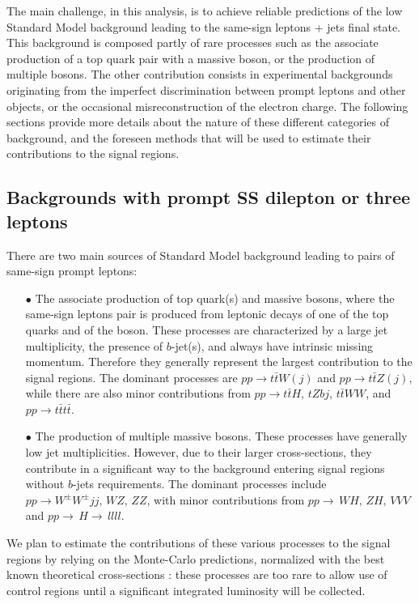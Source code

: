 The main challenge, in this analysis, is to achieve reliable predictions of the low Standard Model background 
leading to the same-sign leptons + jets final state. 
This background is composed partly of rare processes such as the associate production of a top quark pair with a massive boson, 
or the production of multiple bosons. 
The other contribution consists in experimental backgrounds originating from the imperfect discrimination between prompt leptons and other objects, 
or the occasional misreconstruction of the electron charge. 
The following sections provide more details about the nature of these different categories of background, 
and the foreseen methods that will be used to estimate their contributions to the signal regions. 

\subsection{Backgrounds with prompt SS dilepton or three leptons}
\label{sec:bkg_prompt}

There are two main sources of Standard Model background leading to pairs of same-sign prompt leptons: 
\begin{itemize}
\item[$\bullet$] The associate production of top quark(s) and massive bosons, where the same-sign leptons pair 
is produced from leptonic decays of one of the top quarks and of the boson. 
These processes are characterized by a large jet multiplicity, the presence of $b$-jet(s), 
and always have intrinsic missing momentum. 
Therefore they generally represent the largest contribution to the signal regions. 
The dominant processes are $pp\to t\bar{t}W(j)$ and $pp\to t\bar{t}Z(j)$, 
while there are also minor contributions from $pp\to t\bar{t}H,\,tZbj,\,t\bar{t}WW$, and $pp\to t\bar{t}t\bar{t}$. 
\item[$\bullet$] The production of multiple massive bosons. 
These processes have generally low jet multiplicities. 
However, due to their larger cross-sections, they contribute in a significant way to the background entering signal regions without $b$-jets requirements. 
The dominant processes include $pp\to W^\pm W^\pm jj,\,WZ,\,ZZ$, 
with minor contributions from $pp\to\,WH,\,ZH,\,VVV$ and $pp \to\,H\to\,llll$.  
\end{itemize}

We plan to estimate the contributions of these various processes to the signal regions by relying on the Monte-Carlo predictions, 
normalized with the best known theoretical cross-sections : 
these processes are too rare to allow use of control regions until a significant integrated luminosity will be collected. 

